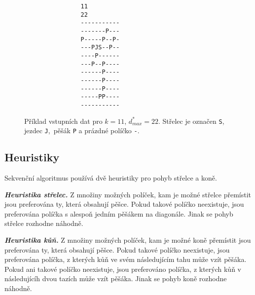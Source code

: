 \documentclass{article}
\newcommand{\heuristika}[1]{\textbf{\textit{Heuristika {#1}.}}}
\begin{document}
    \begin{figure}[h]
        \begin{center}
            \begin{BVerbatim}
                11
                22
                -----------
                -------P---
                P-----P--P-
                ---PJS--P--
                ----P------
                ---P--P----
                ------P----
                ------P----
                ------P----
                -----PP----
                -----------
            \end{BVerbatim}
        \end{center}
        \cprotect\caption{ Příklad vstupních dat pro $k=11$, $d^{*}_{max}=22$. Střelec je označen \verb|S|, jezdec \verb|J|,\
            pěšák \verb|P| a prázdné políčko \verb|-|. }
        \label{fig:board-example}
    \end{figure}


    \label{subsec:seq-heuristics}

    \subsection{Heuristiky}

    Sekvenční algoritmus používá dvě heuristiky pro pohyb střelce a koně.

    \heuristika{střelec} Z množiny možných políček, kam je možné střelce přemístit jsou preferována ty,
    která obsahují pěšce. Pokud takové políčko neexistuje, jsou preferována políčka s alespoň jedním pěšákem
    na diagonále. Jinak se pohyb střelce rozhodne náhodně.
    \hspace{1.5pt}

    \heuristika{kůň} Z množiny možných políček, kam je možné koně přemístit jsou preferována ty,
    která obsahují pěšce. Pokud takové políčko neexistuje, jsou preferována políčka, z kterých
    kůň ve svém následujícím tahu může vzít pěšáka. Pokud ani takové políčko neexistuje, jsou
    preferováno políčka, z kterých kůň v následujícíh dvou tazích může vzít pěšáka.
    Jinak se pohyb koně rozhodne náhodně.
\end{document}
